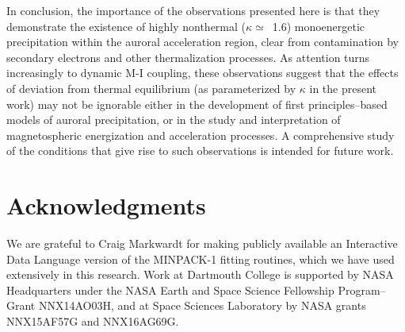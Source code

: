   In conclusion, the importance of the observations presented here is that they
  demonstrate the existence of highly nonthermal ($\kappa \simeq$~1.6)
  monoenergetic precipitation within the auroral acceleration region, clear from
  contamination by secondary electrons and other thermalization processes. As
  attention turns increasingly to dynamic M-I coupling, these observations
  suggest that the effects of deviation from thermal equilibrium (as
  parameterized by $\kappa$ in the present work) may not be ignorable either in
  the development of first principles--based models of auroral precipitation, or
  in the study and interpretation of magnetospheric energization and
  acceleration processes. A comprehensive study of the conditions that give rise
  to such observations is intended for future work.



  
  \section*{Acknowledgments}

  We are grateful to Craig Markwardt for making publicly available an
  Interactive Data Language version of the MINPACK-1 fitting routines, which we
  have used extensively in this research. Work at Dartmouth College is supported
  by NASA Headquarters under the NASA Earth and Space Science Fellowship
  Program--Grant NNX14AO03H, and at Space Sciences Laboratory by NASA grants
  NNX15AF57G and NNX16AG69G.



